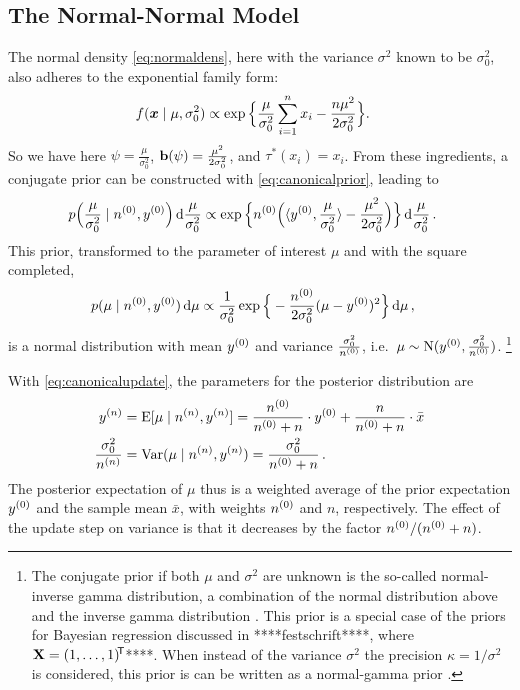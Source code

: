 \subsection{The Normal-Normal Model}
\label{sec:norm-norm}

The normal density \eqref{eq:normaldens}, here with the variance $\sigma^2$ known to be $\sigma^2_0$,
also adheres to the exponential family form:
\begin{align*}
f({\bm x} \mid \mu, \sigma_0^2)
 &\propto \exp\Big\{ \frac{\mu}{\sigma_0^2} \sum_{i=1}^n x_i - \frac{n\mu^2}{2\sigma_0^2} \Big\}.
\end{align*}
So we have here $\psi = \frac{\mu}{\sigma_0^2}$, $\mathbf{b}(\psi) = \frac{\mu^2}{2\sigma_0^2}$, and $\tau^*(x_i) = x_i$.
From these ingredients, a conjugate prior can be constructed with \eqref{eq:canonicalprior}, leading to
\begin{align*}
p\Big(\frac{\mu}{\sigma_0^2} \mid n^{(0)}, y^{(0)}\Big) \,\mathrm{d}\frac{\mu}{\sigma_0^2}
 &\propto \exp\Big\{ n^{(0)} \Big( \langle y^{(0)}, \frac{\mu}{\sigma_0^2} \rangle - \frac{\mu^2}{2\sigma_0^2} \Big) \Big\} \,\mathrm{d}\frac{\mu}{\sigma_0^2}\,.
\end{align*}
This prior, transformed to the parameter of interest $\mu$ and with the square completed,
\begin{align*}
p(\mu \mid n^{(0)}, y^{(0)}) \,\mathrm{d}\mu
 &\propto \frac{1}{\sigma_0^2} \exp\Big\{ -\frac{n^{(0)}}{2\sigma_0^2} (\mu - y^{(0)})^2 \Big\} \,\mathrm{d}\mu\,,
\end{align*}
is a normal distribution with mean $y^{(0)}$ and variance $\frac{\sigma_0^2}{n^{(0)}}$,
i.e.\ $\mu \sim \operatorname{N}(y^{(0)}, \frac{\sigma_0^2}{n^{(0)}})$.%
\footnote{The conjugate prior if both $\mu$ and $\sigma^2$ are unknown
is the so-called normal-inverse gamma distribution,
a combination of the normal distribution above and the inverse gamma distribution
\parencite[see, e.g.,][pp.~119, 431]{2000:bernardosmith}.
This prior is a special case of the priors for Bayesian regression discussed in ****festschrift****,
where $\mathbf{X} = (1, \ldots, 1)^{{\mbox{\!\scriptsize\textsf{T}}}}$****.
When instead of the variance $\sigma^2$ the precision $\kappa = 1/\sigma^2$ is considered,
this prior is can be written as a normal-gamma prior
\parencite[see, e.g.,][pp.~136, 434]{2000:bernardosmith}.}

With \eqref{eq:canonicalupdate}, the parameters for the posterior distribution are
\begin{align}
y^{(n)} &= \operatorname{E}[\mu\mid n^{(n)}, y^{(n)}] = \frac{n^{(0)}}{n^{(0)} + n} \cdot y^{(0)} + \frac{n}{n^{(0)} + n} \cdot \bar{x} \label{eq:normalposte}\\
\frac{\sigma_0^2}{n^{(n)}} &= \operatorname{Var}(\mu\mid n^{(n)}, y^{(n)}) = \frac{\sigma_0^2}{n^{(0)} + n}\,. \label{eq:normalpostvar}
\end{align}
The posterior expectation of $\mu$ thus is a weighted average of the prior expectation $y^{(0)}$ and the sample mean $\bar{x}$,
with weights $n^{(0)}$ and $n$, respectively.
The effect of the update step on variance is that it decreases by the factor $n^{(0)}/(n^{(0)}+n)$.

